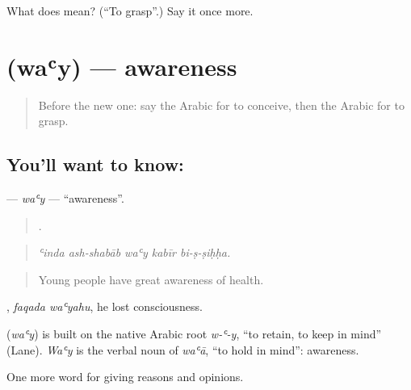 \begin{tcolorbox}[breakable,colback=teal!4,colframe=teal!35!black,title={Before you move on}]
What does  mean? (\textquotedblleft{}To grasp\textquotedblright{}.) Say it once more.
\end{tcolorbox}
\section[\texorpdfstring{\ar{وعي} (waʿy)}{وعي (waʿy)}]{ (waʿy) — awareness}

\label{lesson:AR-C367-way}



\begin{quote}
Before the new one: say the Arabic for to conceive, then the Arabic for to grasp.
\end{quote}

\subsection*{You'll want to know: }
\textbf{} — \emph{waʿy} — \textquotedblleft{}awareness\textquotedblright{}.

\begin{quote}
    .
\end{quote}

\begin{quote}
\emph{ʿinda ash-shabāb waʿy kabīr bi-ṣ-ṣiḥḥa.}
\end{quote}

\begin{quote}
Young people have great awareness of health.
\end{quote}

 , \emph{faqada waʿyahu}, he lost consciousness.

\begin{cousinweb}
\textbf{} (\emph{waʿy}) is built on the native Arabic root \emph{w-ʿ-y}, \textquotedblleft{}to retain, to keep in mind\textquotedblright{} (Lane). \emph{Waʿy} is the verbal noun of \emph{waʿā}, \textquotedblleft{}to hold in mind\textquotedblright{}: awareness.
\end{cousinweb}

\begin{grammarlens}[title={What you've built}]
One more word for giving reasons and opinions.
\end{grammarlens}

